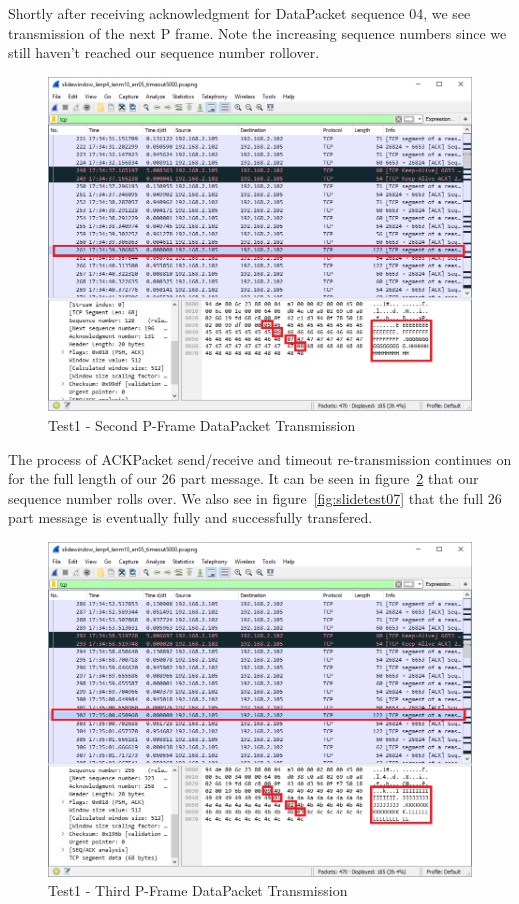 \documentclass[12pt]{article}
\begin{document}
Shortly after receiving acknowledgment for DataPacket sequence 04, we
see transmission of the next P frame. Note the increasing sequence numbers
since we still haven't reached our sequence number rollover. 

\begin{figure}[H]
    \centering
    \includegraphics[width=5.5in]{slide_test1_05.png}
    \caption{Test1 - Second P-Frame DataPacket Transmission}
    \label{fig:slidetest05}
\end{figure}

The process of ACKPacket send/receive and timeout re-transmission continues
on for the full length of our 26 part message. It can be seen in 
figure~\ref{fig:slidetest06} that our sequence number rolls over. We also
see in figure~\ref{fig:slidetest07} that the full 26 part message is 
eventually fully and successfully transfered. 

\begin{figure}[H]
    \centering
    \includegraphics[width=5.5in]{slide_test1_06.png}
    \caption{Test1 - Third P-Frame DataPacket Transmission}
    \label{fig:slidetest06}
\end{figure}
\end{document}
